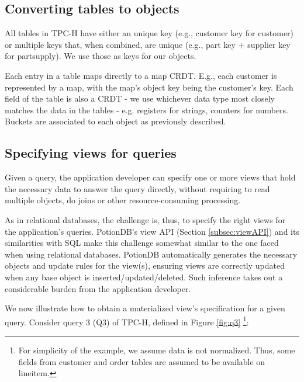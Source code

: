 \documentclass{vldb}
\begin{document}
\subsection{Converting tables to objects}
\label{subsec:tables_to_objects}

All tables in TPC-H have either an unique key (e.g., customer key for customer) or multiple keys that, when combined, are unique (e.g., part key + supplier key for partsupply).
We use those as keys for our objects.	%

Each entry in a table maps directly to a map CRDT.
E.g., each customer is represented by a map, with the map's object key being the customer's key.
Each field of the table is also a CRDT - we use whichever data type most closely matches the data in the tables - e.g. registers for strings, counters for numbers.
Buckets are associated to each object as previously described.

\subsection{Specifying views for queries}
\label{subsec:views_for_queries}

Given a query, the application developer can specify one or more views that hold the necessary data to answer the query directly, without requiring to read multiple objects, do joins or other resource-consuming processing.

As in relational databases, the challenge is, thus, to specify the right views for the application's queries.
PotionDB's view API (Section \ref{subsec:viewAPI}) and its similarities with SQL make this challenge somewhat similar to the one faced when using relational databases.
PotionDB automatically generates the necessary objects and update rules for the view(s), ensuring views are correctly updated when any base object is inserted/updated/deleted.
Such inference takes out a considerable burden from the application developer.

We now illustrate how to obtain a materialized view’s specification for a given query. 
Consider query 3 (Q3) of TPC-H, defined in Figure \ref{fig:q3}
\footnote{For simplicity of the example, we assume data is not normalized. Thus, some fields from customer and order tables are assumed to be available on lineitem.}:
\end{document}
